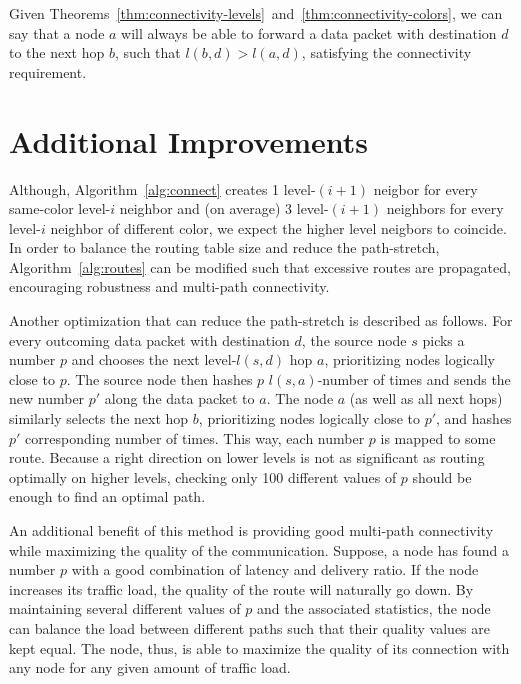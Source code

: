 \documentclass[14pt]{extarticle}
\theoremstyle{definition}
\begin{document}
Given Theorems~\ref{thm:connectivity-levels}~and~\ref{thm:connectivity-colors}, we can say that a node $a$ will always be able to forward a data packet with destination $d$ to the next hop $b$, such that $l(b,d) > l(a,d)$, satisfying the connectivity requirement.


\section{Additional Improvements}

Although, Algorithm~\ref{alg:connect} creates 1 level-$(i+1)$ neigbor for every same-color level-$i$ neighbor and (on average) 3 level-$(i+1)$ neighbors for every level-$i$ neighbor of different color, we expect the higher level neigbors to coincide. In order to balance the routing table size and reduce the path-stretch, Algorithm~\ref{alg:routes} can be modified such that excessive routes are propagated, encouraging robustness and multi-path connectivity.

Another optimization that can reduce the path-stretch is described as follows. For every outcoming data packet with destination $d$, the source node $s$ picks a number $p$ and chooses the next level-$l(s,d)$ hop $a$, prioritizing nodes logically close to $p$. The source node then hashes $p$ $l(s,a)$-number of times and sends the new number $p'$ along the data packet to $a$. The node $a$ (as well as all next hops) similarly selects the next hop $b$, prioritizing nodes logically close to $p'$, and hashes $p'$ corresponding number of times. This way, each number $p$ is mapped to some route. Because a right direction on lower levels is not as significant as routing optimally on higher levels, checking only 100 different values of $p$ should be enough to find an optimal path.

An additional benefit of this method is providing good multi-path connectivity while maximizing the quality of the communication. Suppose, a node has found a number $p$ with a good combination of latency and delivery ratio. If the node increases its traffic load, the quality of the route will naturally go down. By maintaining several different values of $p$ and the associated statistics, the node can balance the load between different paths such that their quality values are kept equal. The node, thus, is able to maximize the quality of its connection with any node for any given amount of traffic load.
\end{document}
